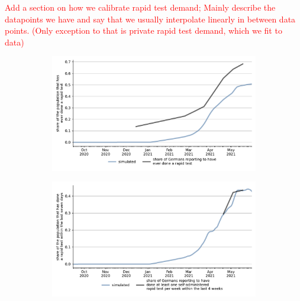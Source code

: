 


\textcolor{red}{
    Add a section on how we calibrate rapid test demand; Mainly describe the
    datapoints we have and say that we usually interpolate linearly in between data
    points. (Only exception to that is private rapid test demand, which we fit to data)
}


\begin{figure}[ht]
    \centering
    \caption{Share of Individuals With Rapid Tests}
    \label{fig:share_ever_rapid_test}
    \begin{subfigure}{.55\textwidth}
      \includegraphics[width=0.9 \textwidth]{../figures/results/figures/scenario_comparisons/combined_fit/full_share_ever_rapid_test}
    \end{subfigure}%
    \begin{subfigure}{.55\textwidth}
      \includegraphics[width=0.9 \textwidth]{../figures/results/figures/scenario_comparisons/combined_fit/full_share_rapid_test_in_last_week}
    \end{subfigure}
    \label{fig:share_rapid_test_last_week}
\end{figure}
